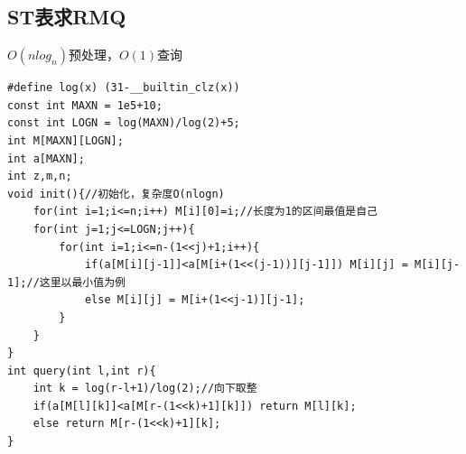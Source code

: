 \documentclass[a4]{ctexart}
\begin{document}
\subsection{ST表求RMQ}
$O(nlog_n)$预处理，$O(1)$查询
\begin{lstlisting}
#define log(x) (31-__builtin_clz(x))
const int MAXN = 1e5+10;
const int LOGN = log(MAXN)/log(2)+5;
int M[MAXN][LOGN]; 
int a[MAXN];
int z,m,n;
void init(){//初始化，复杂度O(nlogn) 
	for(int i=1;i<=n;i++) M[i][0]=i;//长度为1的区间最值是自己 
	for(int j=1;j<=LOGN;j++){
		for(int i=1;i<=n-(1<<j)+1;i++){
			if(a[M[i][j-1]]<a[M[i+(1<<(j-1))][j-1]]) M[i][j] = M[i][j-1];//这里以最小值为例 
			else M[i][j] = M[i+(1<<j-1)][j-1];
		}
	} 
}
int query(int l,int r){
	int k = log(r-l+1)/log(2);//向下取整
	if(a[M[l][k]]<a[M[r-(1<<k)+1][k]]) return M[l][k];
	else return M[r-(1<<k)+1][k];
}
\end{lstlisting}
\end{document}
